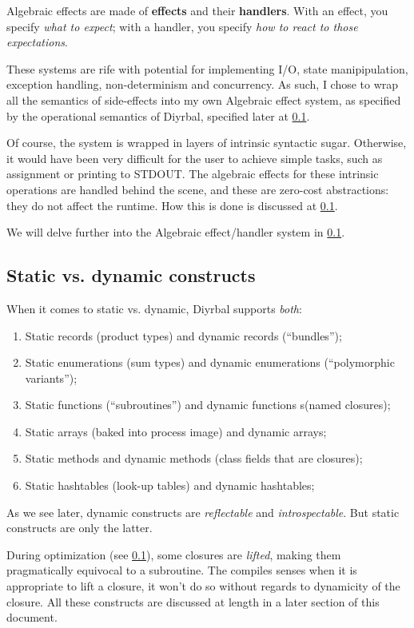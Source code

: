 \documentclass[a4paper,12pt]{article}
\newcommand{\nm}{Diyrbal\xspace}
\begin{document}
Algebraic effects are made of \textbf{effects} and their \textbf{handlers}. With an effect, you specify \textit{what to expect}; with a handler, you specify \textit{how to react to those expectations}.

These systems are rife with potential for implementing I/O, state manipipulation, exception handling, non-determinism and concurrency. As such, I chose to wrap all the semantics of side-effects into my own Algebraic effect system, as specified by the operational semantics of \nm, specified later at \cref{}.

Of course, the system is wrapped in layers of intrinsic syntactic sugar. Otherwise, it would have been very difficult for the user to achieve simple tasks, such as assignment or printing to STDOUT. The algebraic effects for these intrinsic operations are handled behind the scene, and these are zero-cost abstractions: they do not affect the runtime. How this is done is discussed at \cref{}.

We will delve further into the Algebraic effect/handler system in \cref{}.

\subsection{Static vs. dynamic constructs}

When it comes to static vs. dynamic, \nm supports \textit{both}:

\begin{enumerate}
	\item Static records (product types) and dynamic records (``bundles'');
	\item Static enumerations (sum types) and dynamic enumerations (``polymorphic variants'');
	\item Static functions (``subroutines'') and dynamic functions s(named closures);
	\item Static arrays (baked into process image) and dynamic arrays;
	\item Static methods and dynamic methods (class fields that are closures);
	\item Static hashtables (look-up tables) and dynamic hashtables;
\end{enumerate}

As we see later, dynamic constructs are \textit{reflectable} and \textit{introspectable}. But static constructs are only the latter. 

During optimization (see \cref{}), some closures are \textit{lifted}, making them pragmatically equivocal to a subroutine. The compiles senses when it is appropriate to lift a closure, it won't do so without regards to dynamicity of the closure. All these constructs are discussed at length in a later section of this document.
\end{document}
